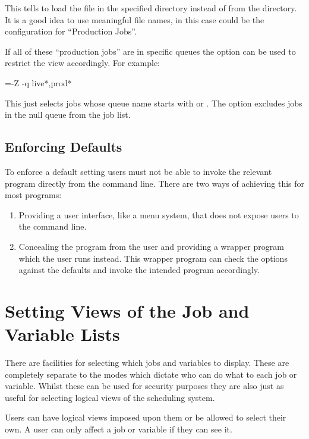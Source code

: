 This tells \PrBtq{} to load the file  in the specified directory instead of
 from the  directory. It is a good idea to use meaningful file names, in this case
 could be the configuration for ``Production Jobs''.

If all of these ``production jobs'' are in specific queues the  option can be used to restrict the view
accordingly. For example:

\begin{expara}

\BtqVarname=-Z -q live*,prod*

\end{expara}

This just selects jobs whose queue name starts with  or . The  option excludes jobs in the null queue from the job list.

\subsection{Enforcing Defaults}
To enforce a default setting users must not be able to invoke the relevant program directly from the command line. There are two ways of
achieving this for most programs:

\begin{enumerate}
\item Providing a user interface, like a menu system, that does not expose users to the command line.
\item Concealing the program from the user and providing a wrapper program which the user runs instead. This wrapper program can check the
options against the defaults and invoke the intended program accordingly.
\end{enumerate}

\section{Setting Views of the Job and Variable Lists}
There are facilities for selecting which jobs and variables to display. These are completely separate to the modes which dictate who can
do what to each job or variable. Whilst these can be used for security purposes they are also just as useful for selecting logical views of the scheduling system.

Users can have logical views imposed upon them or be allowed to select their own. A user can only affect a job or variable if they can see it.

